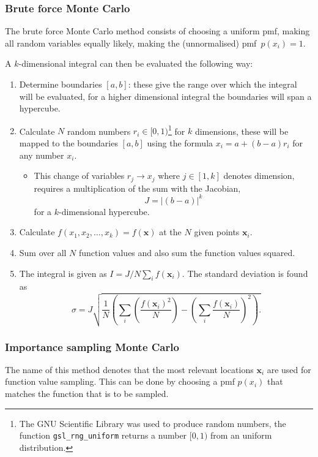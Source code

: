 \documentclass[a4paper,11pt]{article}
\begin{document}
\subsubsection{Brute force Monte Carlo}
The brute force Monte Carlo method consists of choosing a uniform pmf, making all random variables equally likely, making the (unnormalised) pmf~$p(x_i) = 1$.

A $k$-dimensional integral can then be evaluated the following way:
\begin{enumerate}
    \item Determine boundaries $[a,b]$: these give the range over which the integral will be evaluated, for a higher dimensional integral the boundaries will span a hypercube. 
    \item Calculate $N$ random numbers $r_i \in [0,1)$\footnote{The GNU Scientific Library was used to produce random numbers, the function \texttt{gsl\_rng\_uniform} returns a number $[0,1)$ from an uniform distribution.} for $k$ dimensions, these will be mapped to the boundaries $[a,b]$ using the formula $x_i = a + (b - a) r_i$ for any number $x_i$.
        \begin{itemize}
            \item This change of variables $r_j \to x_j$ where $j \in [1,k]$ denotes dimension, requires a multiplication of the sum with the Jacobian,
                \[ J = |(b - a)|^k \]
            for a $k$-dimensional hypercube.
        \end{itemize}
    \item Calculate $f(x_1, x_2, \dots, x_k) = f(\mathbf{x})$ at the $N$ given points $\mathbf{x}_i$. 
    \item Sum over all $N$ function values and also sum the function values squared.
    \item The integral is given as $I = J/N \sum_i f(\mathbf{x}_i)$. The standard deviation is found as
        \[ \sigma = J \sqrt{ \frac{1}{N}\left( \sum_i\left( \frac{f(\mathbf{x}_i)^2}{N} \right) - \left( \sum_i \frac{f(\mathbf{x}_i)}{N} \right)^2   \right).   } \]
\end{enumerate}

\subsubsection{Importance sampling Monte Carlo}
The name of this method denotes that the most relevant locations $\mathbf{x}_i$ are used for function value sampling. This can be done by choosing a pmf $p(x_i)$ that matches the function that is to be sampled.
\end{document}
